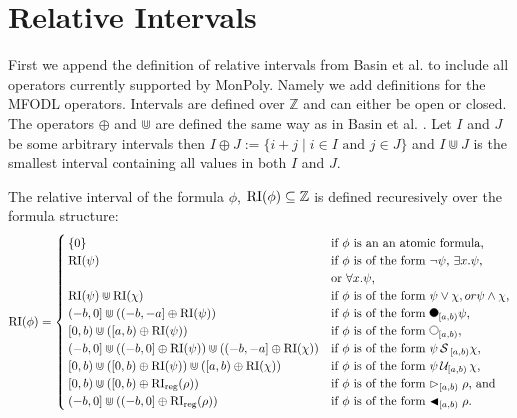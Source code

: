 \section{Relative Intervals}

First we append the definition of relative intervals from Basin et al. \cite{Basin2016} to include all operators currently supported by MonPoly.
Namely we add definitions for the MFODL operators.
Intervals are defined over $\mathbb{Z}$ and can either be open or closed.
The operators $\oplus$ and $\Cup$ are defined the same way as in Basin et al. \cite{Basin2016}.
Let $I$ and $J$ be some arbitrary intervals then $I \oplus J := \{i+j \mid i \in I \text{ and } j \in J\}$ and $I \Cup J$ is the smallest interval containing all values in both $I$ and $J$.

\begin{definition} 
    The relative interval of the formula $\phi$, $\operatorname{RI}(\phi) \subseteq \mathbb{Z}$ is defined recuresively over the formula structure: 
    \begin{equation*}
        \RI(\phi) =
        \begin{cases}
            \{0\}     & \text{if $\phi$ is an an atomic formula,} \\ 
            \RI(\psi) & \text{if $\phi$ is of the form $\neg \psi$, 
                                $\exists x.\psi$,} \\ &\text{or $\forall x.\psi$,} \\
            \RI(\psi) \Cup \RI(\chi) & \text{if $\phi$ is of the form $\psi \lor \chi, or
                                            \psi \land \chi$,} \\
            (-b,0] \Cup ((-b,-a] \oplus \RI(\psi)) & \text{if $\phi$ is of the form $\Previous{[a,b)}\psi$,} \\
            [0,b) \Cup ([a,b) \oplus \RI(\psi)) & \text{if $\phi$ is of the form $\Next{[a,b)}$,}\\
            (-b,0] \Cup ((-b,0] \oplus \RI(\psi)) \Cup ((-b,-a] \oplus \RI(\chi)) & \text{if $\phi$ is of the form $\psi \Since{}_{[a,b)} \chi$,} \\
            [0,b) \Cup ([0,b) \oplus \RI(\psi)) \Cup ([a,b) \oplus \RI(\chi)) & \text{if $\phi$ is of the form $\psi \Until{[a,b)} \chi$,} \\
            [0,b) \Cup ([0,b) \oplus \RIr(\rho)) & \text{if $\phi$ is of the form $\Fregex{[a,b)} \rho$, and}\\
            (-b,0] \Cup ((-b,0] \oplus \RIr(\rho)) & \text{if $\phi$ is of the form $\Pregex{[a,b)} \rho$.}\\
        \end{cases}
    \end{equation*}
\end{definition}

